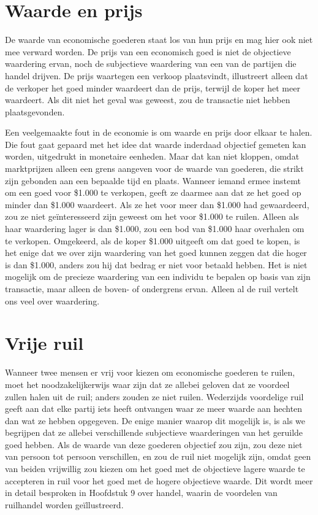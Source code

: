 \section{Waarde en prijs}

De waarde van economische goederen staat los van hun prijs en mag hier ook niet mee verward worden. De prijs van een economisch goed is niet de objectieve waardering ervan, noch de subjectieve waardering van een van de partijen die handel drijven. De prijs waartegen een verkoop plaatsvindt, illustreert alleen dat de verkoper het goed minder waardeert dan de prijs, terwijl de koper het meer waardeert. Als dit niet het geval was geweest, zou de transactie niet hebben plaatsgevonden.

Een veelgemaakte fout in de economie is om waarde en prijs door elkaar te halen. Die fout gaat gepaard met het idee dat waarde inderdaad objectief gemeten kan worden, uitgedrukt in monetaire eenheden. Maar dat kan niet kloppen, omdat marktprijzen alleen een grens aangeven voor de waarde van goederen, die strikt zijn gebonden aan een bepaalde tijd en plaats. Wanneer iemand ermee instemt om een goed voor \$1.000 te verkopen, geeft ze daarmee aan dat ze het goed op minder dan \$1.000 waardeert. Als ze het voor meer dan \$1.000 had gewaardeerd, zou ze niet geïnteresseerd zijn geweest om het voor \$1.000 te ruilen. Alleen als haar waardering lager is dan \$1.000, zou een bod van \$1.000 haar overhalen om te verkopen. Omgekeerd, als de koper \$1.000 uitgeeft om dat goed te kopen, is het enige dat we over zijn waardering van het goed kunnen zeggen dat die hoger is dan \$1.000, anders zou hij dat bedrag er niet voor betaald hebben. Het is niet mogelijk om de precieze waardering van een individu te bepalen op basis van zijn transactie, maar alleen de boven- of ondergrens ervan. Alleen al de ruil vertelt ons veel over waardering.

\section{Vrije ruil}

Wanneer twee mensen er vrij voor kiezen om economische goederen te ruilen, moet het noodzakelijkerwijs waar zijn dat ze allebei geloven dat ze voordeel zullen halen uit de ruil; anders zouden ze niet ruilen. Wederzijds voordelige ruil geeft aan dat elke partij iets heeft ontvangen waar ze meer waarde aan hechten dan wat ze hebben opgegeven. De enige manier waarop dit mogelijk is, is als we begrijpen dat ze allebei verschillende subjectieve waarderingen van het geruilde goed hebben. Als de waarde van deze goederen objectief zou zijn, zou deze niet van persoon tot persoon verschillen, en zou de ruil niet mogelijk zijn, omdat geen van beiden vrijwillig zou kiezen om het goed met de objectieve lagere waarde te accepteren in ruil voor het goed met de hogere objectieve waarde. Dit wordt meer in detail besproken in Hoofdstuk 9 over handel, waarin de voordelen van ruilhandel worden geïllustreerd.

